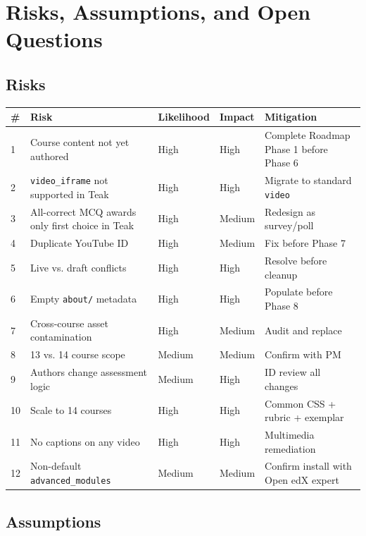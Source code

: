 \chapter{Risks, Assumptions, and Open Questions}

\section{Risks}

\begin{longtable}{@{}p{}p{}p{}p{}p{}@{}}
\toprule
\textbf{\#} & \textbf{Risk} & \textbf{Likelihood} & \textbf{Impact} & \textbf{Mitigation} \\
\midrule
\endhead
1 & Course content not yet authored & High & High & Complete Roadmap Phase 1 before Phase 6 \\
2 & \texttt{video\_iframe} not supported in Teak & High & High & Migrate to standard \texttt{video} \\
3 & All-correct MCQ awards only first choice in Teak & High & Medium & Redesign as survey/poll \\
4 & Duplicate YouTube ID & High & Medium & Fix before Phase 7 \\
5 & Live vs. draft conflicts & High & High & Resolve before cleanup \\
6 & Empty \texttt{about/} metadata & High & High & Populate before Phase 8 \\
7 & Cross-course asset contamination & High & Medium & Audit and replace \\
8 & 13 vs. 14 course scope & Medium & Medium & Confirm with PM \\
9 & Authors change assessment logic & Medium & High & ID review all changes \\
10 & Scale to 14 courses & High & High & Common CSS + rubric + exemplar \\
11 & No captions on any video & High & High & Multimedia remediation \\
12 & Non-default \texttt{advanced\_modules} & Medium & Medium & Confirm install with Open edX expert \\
\bottomrule
\end{longtable}

\section{Assumptions}

